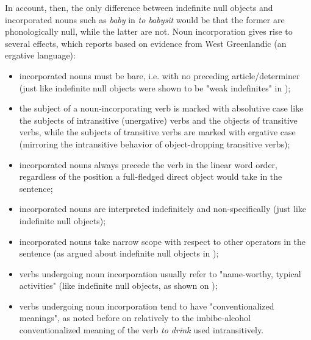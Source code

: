 In  account, then, the only difference between indefinite null objects and incorporated nouns such as \textit{baby} in \textit{to babysit} would be that the former are phonologically null, while the latter are not. Noun incorporation gives rise to several effects, which \textcite[455-456]{Marti2015} reports based on evidence from West Greenlandic (an ergative language):
\begin{itemize}
    \item incorporated nouns must be bare, i.e. with no preceding article/determiner (just like indefinite null objects were shown to be "weak indefinites" in );
    \item the subject of a noun-incorporating verb is marked with absolutive case like the subjects of intransitive (unergative) verbs and the objects of transitive verbs, while the subjects of transitive verbs are marked with ergative case (mirroring the intransitive behavior of object-dropping transitive verbs);
    \item incorporated nouns always precede the verb in the linear word order, regardless of the position a full-fledged direct object would take in the sentence;
    \item incorporated nouns are interpreted indefinitely and non-specifically (just like indefinite null objects);
    \item incorporated nouns take narrow scope with respect to other operators in the sentence (as argued about indefinite null objects in );
    \item verbs undergoing noun incorporation usually refer to "name-worthy, typical activities" (like indefinite null objects, as shown on );
    \item verbs undergoing noun incorporation tend to have "conventionalized meanings", as noted before on  relatively to the imbibe-alcohol conventionalized meaning of the verb \textit{to drink} used intransitively.
\end{itemize}

